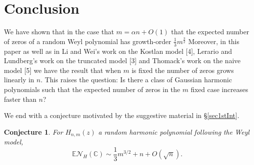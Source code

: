 \documentclass[12pt]{amsart}
\newtheorem*{conjecture}{Conjecture}
\theoremstyle{remark}
\begin{document}
\section{Conclusion}
We have shown that in the case that $m=\alpha n+O(1)$ that the expected number of zeros of a random Weyl polynomial has growth-order $\frac{1}{3}m^{\frac{3}{2}}$ Moreover, in this paper as well as in Li and Wei's work on the Kostlan model [4], Lerario and Lundberg's work on the truncated model [3] and Thomack's work on the naive model [5] we have the result that when $m$ is fixed the number of zeros grows linearly in $n$. This raises the question: Is there a class of Gaussian harmonic polynomials such that the expected number of zeros in the $m$ fixed case increases faster than $n$?

We end with a conjecture motivated by the suggestive material in \S\ref{sec1stInt}.
\begin{conjecture}
For $H_{n,m}(z)$ a random harmonic polynomial following the Weyl model,
\[\mathbb{E}\mathcal{N}_{H}(\mathbb{C})\sim \textstyle\frac{1}{3}m^{3/2}+n+O(\sqrt{n}).\]
\end{conjecture}




\end{document}
